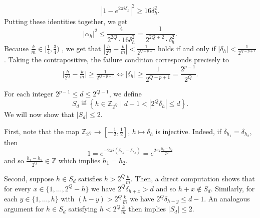 \documentclass[a4paper, oneside, 12pt]{amsart}
\begin{document}
\begin{remark}
\begin{equation*}
    |1 - e^{2\pi i \delta_h}|^2 \geq 16 \delta_{h}^{2}.
  \end{equation*}
  Putting these identities together, we get
  \begin{equation*}
    |\alpha_h|^2 \leq \frac{4}{2^{2Q} \cdot 16\delta_h^2} = \frac{1}{2^{2Q+2} \cdot \delta_h^2}.
  \end{equation*}
  Because \(\tfrac{k}{m} \in [\tfrac{1}{4}, \tfrac{3}{4})\) , we get that  \(\left|\frac{h}{2^{Q}} - \frac{k}{m} \right| < \frac{1}{2^{Q-p+1}}\) holds if and only if \(|\delta_h| < \frac{1}{2^{Q-p+1}}\). Taking the contrapositive, the failure condition corresponds precisely to
  \begin{equation*}
    \big|\tfrac{h}{2^{Q}} - \tfrac{k}{m} \big| \geq \tfrac{1}{2^{Q-p+1}}
    \iff |\delta_h| \geq \frac{1}{2^{Q-p+1}} = \frac{2^{p-1}}{2^Q}.
  \end{equation*}


  For each integer \(2^{p-1} \leq d \leq 2^{Q-1}\), we define
  \begin{equation*}
    S_d \eqdef \left\{ h \in \mathbb{Z}_{2^Q} \;\Big|\; d-1 < | 2^{Q}\delta_{h}| \leq d \right\}.
  \end{equation*}
  We will now show that \(|S_{d}|\leq 2\).

  First, note that the map \(\mathbb{Z}_{2^{Q}} \to [-\tfrac{1}{2}, \tfrac{1}{2}]\), \(h \mapsto \delta_{h}\) is injective.
  Indeed, if \(\delta_{h_1} = \delta_{h_2}\), then
  \begin{equation*}
    1 = e^{-2\pi i (\delta_{h_{1}} - \delta_{h_{2}})} = e^{2\pi i \tfrac{h_1 - h_2}{2^Q}}
  \end{equation*}
  and so \(\tfrac{h_1 - h_2}{2^Q} \in \mathbb{Z}\) which implies \(h_1 = h_2\).

  Second, suppose \(h \in S_{d}\) satisfies \(h > 2^Q \tfrac{k}{m}\).
  Then, a direct computation shows that for every \(x \in\{1, \dots , 2^{Q}-h\}\)  we have \(2^Q\delta_{h+x} > d\) and so \(h+x \notin S_{d}\).
  Similarly,  for each \(y \in\{1, \dots , h\}\) with \((h-y) > 2^{Q} \tfrac{k}{m}\) we have \(2^{Q}\delta_{h-y} \leq d-1\).
  An analogous  argument for \(h \in S_{d}\) satisfying \(h < 2^Q \tfrac{k}{m}\) then implies \(|S_{d}| \leq 2\).


\end{remark}
\end{document}
